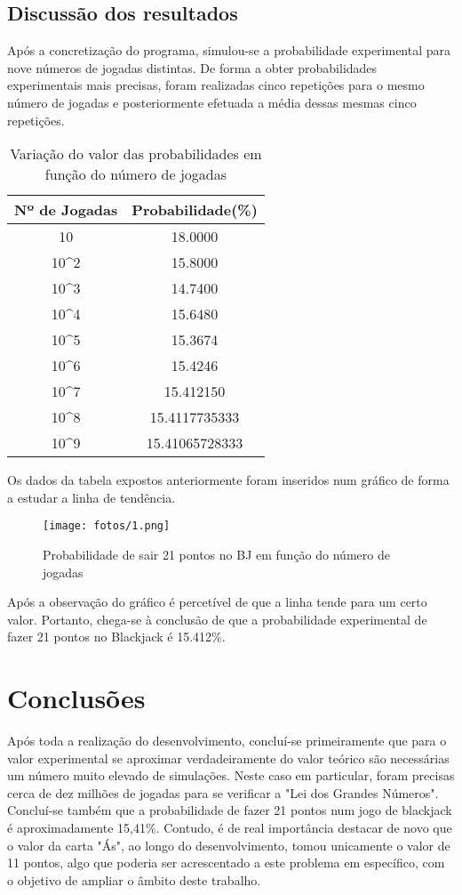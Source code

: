 \documentclass{report}
\begin{document}
\section{Discussão dos resultados}
Após a concretização do programa, simulou-se a probabilidade experimental para nove números de jogadas distintas. De forma a obter probabilidades experimentais mais precisas, foram realizadas cinco repetições para o mesmo número de jogadas e posteriormente efetuada a média dessas mesmas cinco repetições.\
\begin{table}[ht]
\centering
\begin{tabular}{c c}
\hline
Nº de Jogadas & Probabilidade(\%) \\ [0.5ex] %
\hline
10&18.0000\\[1ex]
10^2&15.8000\\[1ex]
10^3&14.7400\\[1ex]
10^4&15.6480\\[1ex]
10^5&15.3674\\[1ex]
10^6&15.4246\\[1ex]
10^7&15.412150\\[1ex]
10^8&15.4117735333\\[1ex]
10^9&15.41065728333\\
\hline
\end{tabular}
\caption{Variação do valor das probabilidades em função do número de jogadas}
\label{tab:my_label}
\end{table}

Os dados da tabela expostos anteriormente foram inseridos num gráfico de forma a estudar a linha de tendência.
\begin{figure}[H]
\center
\texttt{[image: fotos/1.png]}
\caption{Probabilidade de sair 21 pontos no BJ em função do número de jogadas}
\end{figure}

Após a observação do gráfico é percetível de que a linha tende para um certo valor. Portanto, chega-se à conclusão de que a probabilidade experimental de fazer 21 pontos no Blackjack é 15.412\%.

\chapter{Conclusões}
\label{chap.conclusao}
Após toda a realização do desenvolvimento, concluí-se primeiramente que para o valor experimental se aproximar verdadeiramente do valor teórico são necessárias um número muito elevado de simulações. Neste caso em particular, foram precisas cerca de dez milhões de jogadas para se verificar a "Lei dos Grandes Números". Concluí-se também que a probabilidade de fazer 21 pontos num jogo de blackjack é aproximadamente 15,41\%. Contudo, é de real importância destacar de novo que o valor da carta "Ás", ao longo do desenvolvimento, tomou unicamente o valor de 11 pontos, algo que poderia ser acrescentado a este problema em específico, com o objetivo de ampliar o âmbito deste trabalho.
\end{document}
